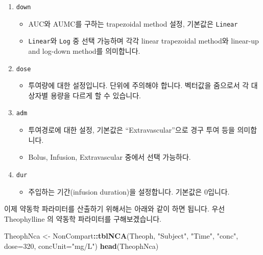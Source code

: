 \documentclass[12pt,]{krantz}
\newenvironment{Shaded}{\begin{snugshade}}{\end{snugshade}}
\newcommand{\KeywordTok}[1]{\textcolor[rgb]{0.13,0.29,0.53}{\textbf{#1}}}
\newcommand{\DataTypeTok}[1]{\textcolor[rgb]{0.13,0.29,0.53}{#1}}
\newcommand{\DecValTok}[1]{\textcolor[rgb]{0.00,0.00,0.81}{#1}}
\newcommand{\StringTok}[1]{\textcolor[rgb]{0.31,0.60,0.02}{#1}}
\newcommand{\OperatorTok}[1]{\textcolor[rgb]{0.81,0.36,0.00}{\textbf{#1}}}
\newcommand{\NormalTok}[1]{#1}
\providecommand{\tightlist}{%
  \setlength{\itemsep}{0pt}\setlength{\parskip}{0pt}}
\theoremstyle{definition}
\theoremstyle{definition}
\theoremstyle{definition}
\theoremstyle{remark}
\begin{document}
\begin{enumerate}
\def\labelenumi{\arabic{enumi}.}
\tightlist
\item
  \texttt{down}

  \begin{itemize}
  \tightlist
  \item
    AUC와 AUMC를 구하는 trapezoidal method 설정, 기본값은
    \texttt{Linear}
  \item
    \texttt{Linear}와 \texttt{Log} 중 선택 가능하며 각각 linear
    trapezoidal method와 linear-up and log-down method를 의미합니다.
  \end{itemize}
\item
  \texttt{dose}

  \begin{itemize}
  \tightlist
  \item
    투여량에 대한 설정입니다. 단위에 주의해야 합니다. 벡터값을 줌으로서
    각 대상자별 용량을 다르게 할 수 있습니다.
  \end{itemize}
\item
  \texttt{adm}

  \begin{itemize}
  \tightlist
  \item
    투여경로에 대한 설정, 기본값은 ``Extravascular''으로 경구 투여 등을
    의미합니다.
  \item
    Bolus, Infusion, Extravascular 중에서 선택 가능하다.
  \end{itemize}
\item
  \texttt{dur}

  \begin{itemize}
  \tightlist
  \item
    주입하는 기간(infusion duration)을 설정합니다. 기본값은 0입니다.
  \end{itemize}
\end{enumerate}

이제 약동학 파라미터를 산출하기 위해서는 아래와 같이 하면 됩니다. 우선
Theophylline 의 약동학 파라미터를 구해보겠습니다.

\begin{Shaded}
\begin{Highlighting}[]
\NormalTok{TheophNca <-}\StringTok{ }\NormalTok{NonCompart}\OperatorTok{::}\KeywordTok{tblNCA}\NormalTok{(Theoph, }\StringTok{"Subject"}\NormalTok{, }\StringTok{"Time"}\NormalTok{, }\StringTok{"conc"}\NormalTok{, }\DataTypeTok{dose=}\DecValTok{320}\NormalTok{, }\DataTypeTok{concUnit=}\StringTok{"mg/L"}\NormalTok{)}
\KeywordTok{head}\NormalTok{(TheophNca)}
\end{Highlighting}
\end{Shaded}
\end{document}
